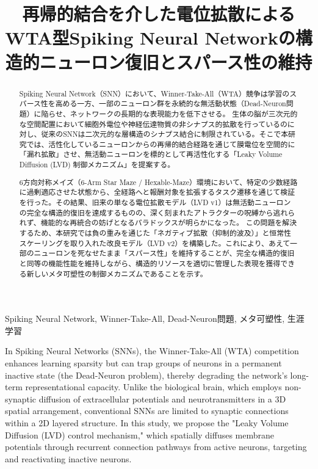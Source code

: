 \documentclass[submit]{ipsj}
\begin{document}
\linenumbers

\title{再帰的結合を介した電位拡散によるWTA型Spiking Neural Networkの構造的ニューロン復旧とスパース性の維持}


\begin{abstract}
Spiking Neural Network（SNN）において、Winner-Take-All（WTA）競争は学習のスパース性を高める一方、一部のニューロン群を永続的な無活動状態（Dead-Neuron問題）に陥らせ、ネットワークの長期的な表現能力を低下させる。
生体の脳が三次元的な空間配置において細胞外電位や神経伝達物質の非シナプス的拡散を行っているのに対し、従来のSNNは二次元的な層構造のシナプス結合に制限されている。そこで本研究では、活性化しているニューロンからの再帰的結合経路を通じて膜電位を空間的に「漏れ拡散」させ、無活動ニューロンを標的として再活性化する「Leaky Volume Diffusion (LVD) 制御メカニズム」を提案する。

6方向対称メイズ（6-Arm Star Maze / Hexable-Maze）環境において、特定の少数経路に過剰適応させた状態から、全経路へと報酬対象を拡張するタスク遷移を通じて検証を行った。その結果、旧来の単なる電位拡散モデル（LVD v1）は無活動ニューロンの完全な構造的復旧を達成するものの、深く刻まれたアトラクターの呪縛から逃れられず、機能的な再統合の妨げとなるパラドックスが明らかになった。
この問題を解決するため、本研究では負の重みを通じた「ネガティブ拡散（抑制的波及）」と恒常性スケーリングを取り入れた改良モデル（LVD v2）を構築した。これにより、あえて一部のニューロンを死なせたまま「スパース性」を維持することが、完全な構造的復旧と同等の機能性能を維持しながら、構造的リソースを適切に管理した表現を獲得できる新しいメタ可塑性の制御メカニズムであることを示す。
\end{abstract}

\begin{jkeyword}
Spiking Neural Network, Winner-Take-All, Dead-Neuron問題, メタ可塑性, 生涯学習
\end{jkeyword}

\begin{eabstract}
In Spiking Neural Networks (SNNs), the Winner-Take-All (WTA) competition enhances learning sparsity but can trap groups of neurons in a permanent inactive state (the Dead-Neuron problem), thereby degrading the network's long-term representational capacity. Unlike the biological brain, which employs non-synaptic diffusion of extracellular potentials and neurotransmitters in a 3D spatial arrangement, conventional SNNs are limited to synaptic connections within a 2D layered structure. In this study, we propose the "Leaky Volume Diffusion (LVD) control mechanism," which spatially diffuses membrane potentials through recurrent connection pathways from active neurons, targeting and reactivating inactive neurons. 
\end{eabstract}
\end{document}
